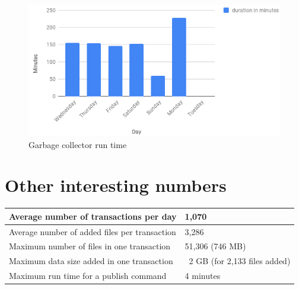 \begin{figure}[h]
\centering
\includegraphics[scale=1.3]{figures/Garbage_collector_run_time}
\caption{Garbage collector run time}
\end{figure}

\section{Other interesting numbers}

\begin{tabu} to 1.1\textwidth { | X[l] | X[c] | }
 \hline
 Average number of transactions per day & 1,070 \\
 \hline
 Average number of added files per transaction  & 3,286  \\
 \hline
 Maximum number of files in one transaction  & 51,306  (746 MB)  \\
 \hline
 Maximum data size added in one transaction  & ~2 GB  (for 2,133 files added)  \\
 \hline
 Maximum run time for a publish command  &  4 minutes  \\
\hline
\end{tabu}